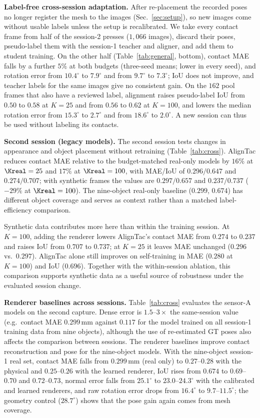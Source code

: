 \noindent\textbf{Label-free cross-session adaptation.} After re-placement the recorded poses no longer register the mesh to the images (Sec.~\ref{sec:setup}), so new images come without usable labels unless the setup is recalibrated. We take every contact frame from half of the session-2 presses ($1{,}066$ images), discard their poses, pseudo-label them with the session-1 teacher and aligner, and add them to student training. On the other half (Table~\ref{tab:general}, bottom), contact MAE falls by a further $5\%$ at both budgets (three-seed means; lower in every seed), and rotation error from $10.4^\circ$ to $7.9^\circ$ and from $9.7^\circ$ to $7.3^\circ$; IoU does not improve, and teacher labels for the same images give no consistent gain. On the $162$ pool frames that also have a reviewed label, alignment raises pseudo-label IoU from $0.50$ to $0.58$ at $K=25$ and from $0.56$ to $0.62$ at $K=100$, and lowers the median rotation error from $15.3^\circ$ to $2.7^\circ$ and from $18.6^\circ$ to $2.0^\circ$. A new session can thus be used without labeling its contacts.

\noindent\textbf{Second session (legacy models).}
The second session tests changes in appearance and object placement without retraining (Table~\ref{tab:cross}). AlignTac reduces contact MAE relative to the budget-matched real-only models by $16\%$ at $\Kreal=25$ and $17\%$ at $\Kreal=100$, with MAE/IoU of $0.296/0.647$ and $0.274/0.707$; with synthetic frames the values are $0.297/0.657$ and $0.237/0.737$ ($-29\%$ at $\Kreal=100$). The nine-object real-only baseline ($0.299$, $0.674$) has different object coverage and serves as context rather than a matched label-efficiency comparison.

Synthetic data contributes more here than within the training session. At $K=100$, adding the renderer lowers AlignTac's contact MAE from $0.274$ to $0.237$ and raises IoU from $0.707$ to $0.737$; at $K=25$ it leaves MAE unchanged ($0.296$ vs.\ $0.297$). AlignTac alone still improves on self-training in MAE ($0.280$ at $K=100$) and IoU ($0.696$). Together with the within-session ablation, this comparison supports synthetic data as a useful source of robustness under the evaluated session change.

\noindent\textbf{Renderer baselines across sessions.} Table~\ref{tab:cross} evaluates the sensor-A models on the second capture. Dense error is $1.5$--$3\times$ the same-session value (e.g.\ contact MAE $0.299\,$mm against $0.117$ for the model trained on all session-1 training data from nine objects), although the use of re-estimated GT poses also affects the comparison between sessions. The renderer baselines improve contact reconstruction and pose for the nine-object models. With the nine-object session-1 real set, contact MAE falls from $0.299\,$mm (real only) to $0.27$--$0.28$ with the physical and $0.25$--$0.26$ with the learned renderer, IoU rises from $0.674$ to $0.69$--$0.70$ and $0.72$--$0.73$, normal error falls from $25.1^\circ$ to $23.0$--$24.3^\circ$ with the calibrated and learned renderers, and raw rotation error drops from $16.4^\circ$ to $9.7$--$11.5^\circ$; the geometry control ($28.7^\circ$) shows that the pose gain again comes from mesh coverage.

